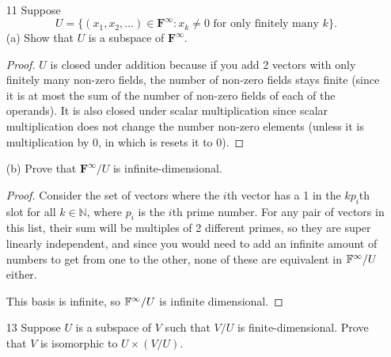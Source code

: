 \begin{enumerate}
\begin{proof}
        This looks a lot like the translate formula, if only $\lambda(v - w)$ formed a subspace. This amounts to proving closure under scalar multiplication and vector addition. Scalar multiplication is trivial; $\lambda$ is right there!

        Consider arbitrary $v_1, v_2 \in -v + A$.

        \begin{align*}
            \lambda(v_1 + v) + (1 - \lambda)(v_2 + v) &= \lambda v_1 + \lambda v + v_2 + v - \lambda v_2 - \lambda v \\
            &= \lambda v_1 - \lambda v_2 + v
        \end{align*}

        Set $\lambda = 1$, and we easily see closure under addition. Thus, $A$ is a translate.
    \end{proof}

    \item[11] Suppose
\[
U = \{(x_1, x_2, \dots) \in \mathbf{F}^{\infty} : x_k \ne 0 \text{ for only finitely many } k\}.
\]
(a) Show that $U$ is a subspace of $\mathbf{F}^{\infty}$.

\begin{proof}
    $U$ is closed under addition because if you add 2 vectors with only finitely many non-zero fields, the number of non-zero fields stays finite (since it is at most the sum of the number of non-zero fields of each of the operands). It is also closed under scalar multiplication since scalar multiplication does not change the number non-zero elements (unless it is multiplication by 0, in which is resets it to 0). 
\end{proof}

(b) Prove that $\mathbf{F}^{\infty}/U$ is infinite-dimensional.

\begin{proof}
    Consider the set of vectors where the $i$th vector has a 1 in the $kp_i$th slot for all $k \in \mathbb{N}$, where $p_i$ is the $i$th prime number. For any pair of vectors in this list, their sum will be multiples of 2 different primes, so they are super linearly independent, and since you would need to add an infinite amount of numbers to get from one to the other, none of these are equivalent in $\mathbb{F}^{\infty}/U$ either.
    
    This basis is infinite, so $\mathbb{F}^{\infty}/U$ is infinite dimensional.
\end{proof}

    \item[13] Suppose $U$ is a subspace of $V$ such that $V/U$ is finite-dimensional.
    Prove that $V$ is isomorphic to $U \times (V/U)$.


\end{enumerate}
